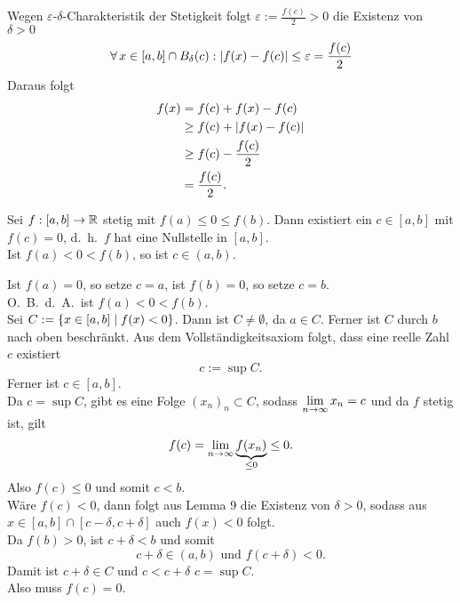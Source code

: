 \documentclass[../ana1.tex]{subfiles}
\begin{document}
\begin{bew}
    Wegen \( \varepsilon \)-\(\delta \)-Charakteristik der 
    Stetigkeit folgt \( \varepsilon := \frac{f(c)}{2} > 0 \) 
    die Existenz von \( \delta > 0 \)
    \[ \forall \, x\in [a,b] \cap B_\delta(c) : 
    \left|f(x) - f(c)\right| \leq \varepsilon = \frac{f(c)}{2} \]
    Daraus folgt
    \begin{align*}
        f(x) &= f(c) + f(x) - f(c) \\
        &\geq f(c) + \left|f(x) - f(c)\right| \\
        &\geq f(c) - \frac{f(c)}{2} \\
        &= \frac{f(c)}{2}.
    \end{align*}
\end{bew}
\begin{lem}[Nullstellensatz]
    Sei \( f : [a,b] \rightarrow \mathbb{R} \) stetig 
    mit \( f(a) \leq 0 \leq f(b) \). Dann existiert 
    ein \( c \in [a,b] \) mit \(f(c) = 0\), d.\ h.\ 
    \(f\) hat eine Nullstelle in \( [a,b] \).\\
    Ist \( f(a) < 0 < f(b) \), so ist \( c \in (a,b) \).
\end{lem}
\begin{bew}
    Ist \( f(a) = 0 \), so setze \( c=a \), ist \(f(b) = 0\), 
    so setze \( c=b \).\\
    O.\ B.\ d.\ A.\ ist \( f(a) < 0 < f(b) \).\\
    Sei \( C := \{x \in [a,b] \;\vert \; f(x) < 0\} \). 
    Dann ist \( C \neq \emptyset \), da \( a \in C \). 
    Ferner ist \(C\) durch \(b\) nach oben beschränkt. 
    Aus dem Vollständigkeitsaxiom folgt, dass eine reelle Zahl 
    \(c\) existiert 
    \[ c := \sup C. \]
    Ferner ist \( c \in [a,b] \).\\
    Da \( c = \sup C \), gibt es eine Folge 
    \( {(x_n)}_n \subset C \), sodass \( \lim\limits_{n\rightarrow\infty} x_n = c \) 
    und da \(f\) stetig ist, gilt 
    \[ f(c) = \lim\limits_{n\rightarrow\infty} \underbrace{f(x_n)}_{\leq 0} \leq 0. \]
    Also \( f(c) \leq 0 \) und somit \( c < b \).\\
    Wäre \( f(c) < 0 \), dann folgt aus Lemma 9 die 
    Existenz von \( \delta > 0 \), sodass aus \( x \in [a,b] 
    \cap [c-\delta, c+\delta] \) auch \( f(x) < 0 \) folgt.\\
    Da \( f(b) > 0 \), ist \( c + \delta < b \) und somit 
    \[ c + \delta \in (a,b) \text{ und } f(c+\delta) < 0. \]
    Damit ist \( c + \delta \in C \) und \( c < c + \delta \) 
    \Lightning{} \(c = \sup C\).\\
    Also muss \( f(c) = 0 \).
\end{bew}
\end{document}
